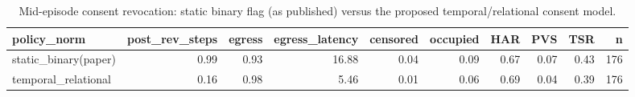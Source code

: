 \begin{table}[t]
\centering
\small
\caption{Mid-episode consent revocation: static binary flag (as published) versus the proposed temporal/relational consent model.}
\label{tab:e2-revocation}
\begin{tabular}{lrrrrrrrrr}
\toprule
policy\_norm & post\_rev\_steps & egress & egress\_latency & censored & occupied & HAR & PVS & TSR & n \\
\midrule
static\_binary(paper) & 0.99 & 0.93 & 16.88 & 0.04 & 0.09 & 0.67 & 0.07 & 0.43 & 176 \\
temporal\_relational & 0.16 & 0.98 & 5.46 & 0.01 & 0.06 & 0.69 & 0.04 & 0.39 & 176 \\
\bottomrule
\end{tabular}
\end{table}
